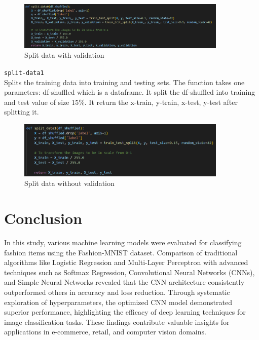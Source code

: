 \documentclass{article}
\newcommand{\code}[1]{\colorbox{light-gray}{\texttt{#1}}}
\begin{document}
\begin{figure}[H]
    \caption{Split data with validation}
    \centering
    \includegraphics[width=10cm]{../imgFolder/splitData0.png}
\end{figure}

\code{split-data1}\\
Splits the training data into training and testing sets.
The function takes one parameters: df-shuffled which is a dataframe.
It split the df-shuffled into training and test value of size 15\%.
It return the x-train, y-train, x-test, y-test after splitting it.
\begin{figure}[H]
    \caption{Split data without validation}
    \centering
    \includegraphics[width=10cm]{../imgFolder/splitData1.png}
\end{figure}

\section{Conclusion}
In this study, various machine learning models were evaluated for classifying fashion items using the Fashion-MNIST dataset.
Comparison of traditional algorithms like Logistic Regression and Multi-Layer Perceptron with advanced techniques such as Softmax Regression, Convolutional Neural Networks (CNNs), and Simple Neural Networks revealed that the CNN architecture consistently outperformed others in accuracy and loss reduction.
Through systematic exploration of hyperparameters, the optimized CNN model demonstrated superior performance, highlighting the efficacy of deep learning techniques for image classification tasks.
These findings contribute valuable insights for applications in e-commerce, retail, and computer vision domains.
\end{document}
